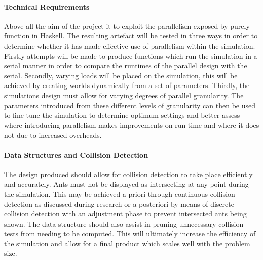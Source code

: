 \documentclass[main.tex]{subfiles}
\begin{document}
\paragraph{Technical Requirements}
Above all the aim of the project it to exploit the parallelism exposed by purely function in Haskell. The resulting artefact will be tested in three ways in order to determine whether it has made effective use of parallelism within the simulation. Firstly attempts will be made to produce functions which run the simulation in a serial manner in order to compare the runtimes of the parallel design with the serial. Secondly, varying loads will be placed on the simulation, this will be achieved by creating worlds dynamically from a set of parameters. Thirdly, the simulations design must allow for varying degrees of parallel granularity. The parameters introduced from these different levels of granularity can then be used to fine-tune the simulation to determine optimum settings and better assess where introducing parallelism makes improvements on run time and where it does not due to increased overheads.

\paragraph{Data Structures and Collision Detection} The design produced should allow for collision detection to take place efficiently and accurately. Ants must not be displayed as intersecting at any point during the simulation. This may be achieved a priori through continuous collision detection as discussed during research or a posteriori by means of discrete collision detection with an adjustment phase to prevent intersected ants being shown. The data structure should also assist in pruning unnecessary collision tests from needing to be computed. This will ultimately increase the efficiency of the simulation and allow for a final product which scales well with the problem size.
\end{document}
